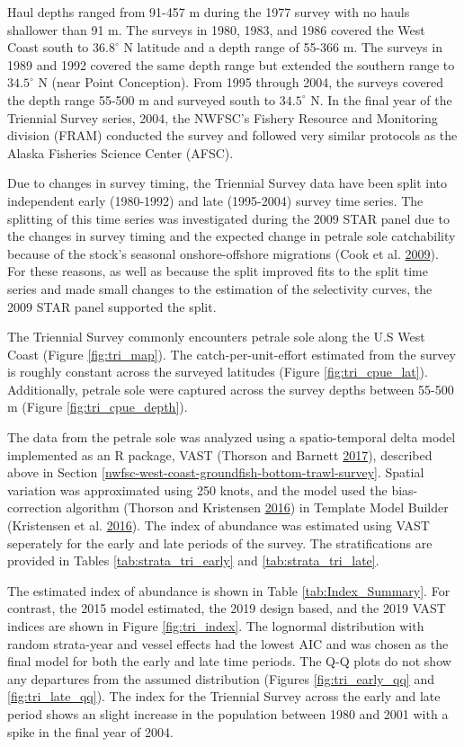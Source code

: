 \documentclass[12pt,]{article}
\begin{document}
Haul depths ranged from 91-457 m during the 1977 survey with no hauls
shallower than 91 m. The surveys in 1980, 1983, and 1986 covered the
West Coast south to \(36.8^\circ\) N latitude and a depth range of
55-366 m. The surveys in 1989 and 1992 covered the same depth range but
extended the southern range to \(34.5^\circ\) N (near Point Conception).
From 1995 through 2004, the surveys covered the depth range 55-500 m and
surveyed south to \(34.5^\circ\) N. In the final year of the Triennial
Survey series, 2004, the NWFSC's Fishery Resource and Monitoring
division (FRAM) conducted the survey and followed very similar protocols
as the Alaska Fisheries Science Center (AFSC).

Due to changes in survey timing, the Triennial Survey data have been
split into independent early (1980-1992) and late (1995-2004) survey
time series. The splitting of this time series was investigated during
the 2009 STAR panel due to the changes in survey timing and the expected
change in petrale sole catchability because of the stock's seasonal
onshore-offshore migrations (Cook et al.
\protect\hyperlink{ref-cook_petrale_2009}{2009}). For these reasons, as
well as because the split improved fits to the split time series and
made small changes to the estimation of the selectivity curves, the 2009
STAR panel supported the split.

The Triennial Survey commonly encounters petrale sole along the U.S West
Coast (Figure \ref{fig:tri_map}). The catch-per-unit-effort estimated
from the survey is roughly constant across the surveyed latitudes
(Figure \ref{fig:tri_cpue_lat}). Additionally, petrale sole were
captured across the survey depths between 55-500 m (Figure
\ref{fig:tri_cpue_depth}).

The data from the petrale sole was analyzed using a spatio-temporal
delta model implemented as an R package, VAST (Thorson and Barnett
\protect\hyperlink{ref-thorson_comparing_2017}{2017}), described above
in Section \ref{nwfsc-west-coast-groundfish-bottom-trawl-survey}.
Spatial variation was approximated using 250 knots, and the model used
the bias-correction algorithm (Thorson and Kristensen
\protect\hyperlink{ref-thorson_implementing_2016}{2016}) in Template
Model Builder (Kristensen et al.
\protect\hyperlink{ref-kristensen_tmb:_2016}{2016}). The index of
abundance was estimated using VAST seperately for the early and late
periods of the survey. The stratifications are provided in Tables
\ref{tab:strata_tri_early} and \ref{tab:strata_tri_late}.

The estimated index of abundance is shown in Table
\ref{tab:Index_Summary}. For contrast, the 2015 model estimated, the
2019 design based, and the 2019 VAST indices are shown in Figure
\ref{fig:tri_index}. The lognormal distribution with random strata-year
and vessel effects had the lowest AIC and was chosen as the final model
for both the early and late time periods. The Q-Q plots do not show any
departures from the assumed distribution (Figures \ref{fig:tri_early_qq}
and \ref{fig:tri_late_qq}). The index for the Triennial Survey across
the early and late period shows an slight increase in the population
between 1980 and 2001 with a spike in the final year of 2004.
\end{document}
